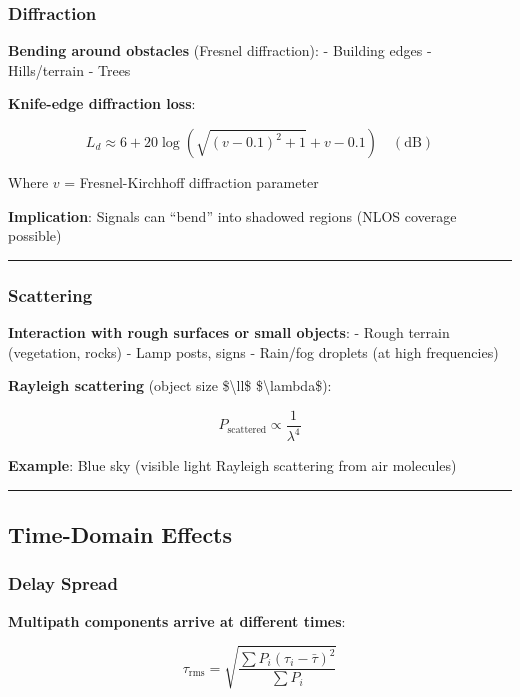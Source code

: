 \subsubsection{Diffraction}\label{diffraction}

\textbf{Bending around obstacles} (Fresnel diffraction): - Building
edges - Hills/terrain - Trees

\textbf{Knife-edge diffraction loss}:

\[
L_d \approx 6 + 20\log\left(\sqrt{(v-0.1)^2 + 1} + v - 0.1\right) \quad (\text{dB})
\]

Where \(v\) = Fresnel-Kirchhoff diffraction parameter

\textbf{Implication}: Signals can ``bend'' into shadowed regions (NLOS
coverage possible)

\begin{center}\rule{0.5\linewidth}{0.5pt}\end{center}

\subsubsection{Scattering}\label{scattering}

\textbf{Interaction with rough surfaces or small objects}: - Rough
terrain (vegetation, rocks) - Lamp posts, signs - Rain/fog droplets (at
high frequencies)

\textbf{Rayleigh scattering} (object size \$\textbackslash ll\$
\$\textbackslash lambda\$):

\[
P_{\text{scattered}} \propto \frac{1}{\lambda^4}
\]

\textbf{Example}: Blue sky (visible light Rayleigh scattering from air
molecules)

\begin{center}\rule{0.5\linewidth}{0.5pt}\end{center}

\subsection{Time-Domain Effects}\label{time-domain-effects}

\subsubsection{Delay Spread}\label{delay-spread}

\textbf{Multipath components arrive at different times}:

\[
\tau_{\text{rms}} = \sqrt{\frac{\sum P_i (\tau_i - \bar{\tau})^2}{\sum P_i}}
\]

